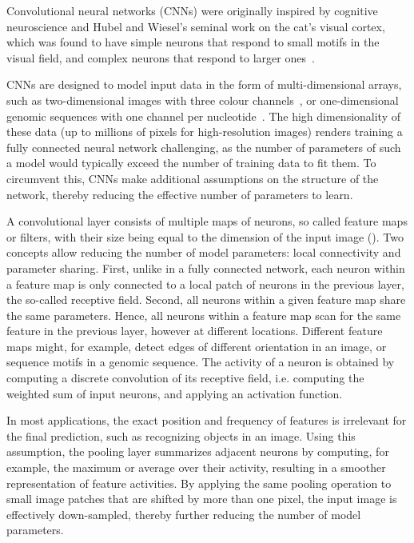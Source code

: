 Convolutional neural networks (CNNs) were originally inspired by cognitive neuroscience and Hubel and Wiesel's seminal work on the cat's visual cortex, which was found to have simple neurons that respond to small motifs in the visual field, and complex neurons that respond to larger ones~\citep{hubel_shape_1963,hubel_period_1970}.

CNNs are designed to model input data in the form of multi-dimensional arrays, such as two-dimensional images with three colour channels~\citep{he_deep_2015,jarrett_what_2009,krizhevsky_imagenet_2012,lecun_backpropagation_1989,szegedy_rethinking_2015,zeiler_visualizing_2014-1}, or one-dimensional genomic sequences with one channel per nucleotide~\citep{alipanahi_predicting_2015,angermueller_accurate_2017,kelley_basset:_2016,zhou_predicting_2015}. The high dimensionality of these data (up to millions of pixels for high-resolution images) renders training a fully connected neural network challenging, as the number of parameters of such a model would typically exceed the number of training data to fit them. To circumvent this, CNNs make additional assumptions on the structure of the network, thereby reducing the effective number of parameters to learn.

A convolutional layer consists of multiple maps of neurons, so called feature maps or filters, with their size being equal to the dimension of the input image (). Two concepts allow reducing the number of model parameters: local connectivity and parameter sharing. First, unlike in a fully connected network, each neuron within a feature map is only connected to a local patch of neurons in the previous layer, the so-called receptive field. Second, all neurons within a given feature map share the same parameters. Hence, all neurons within a feature map scan for the same feature in the previous layer, however at different locations. Different feature maps might, for example, detect edges of different orientation in an image, or sequence motifs in a genomic sequence. The activity of a neuron is obtained by computing a discrete convolution of its receptive field, i.e. computing the weighted sum of input neurons, and applying an activation function.

In most applications, the exact position and frequency of features is irrelevant for the final prediction, such as recognizing objects in an image. Using this assumption, the pooling layer summarizes adjacent neurons by computing, for example, the maximum or average over their activity, resulting in a smoother representation of feature activities. By applying the same pooling operation to small image patches that are shifted by more than one pixel, the input image is effectively down-sampled, thereby further reducing the number of model parameters.

